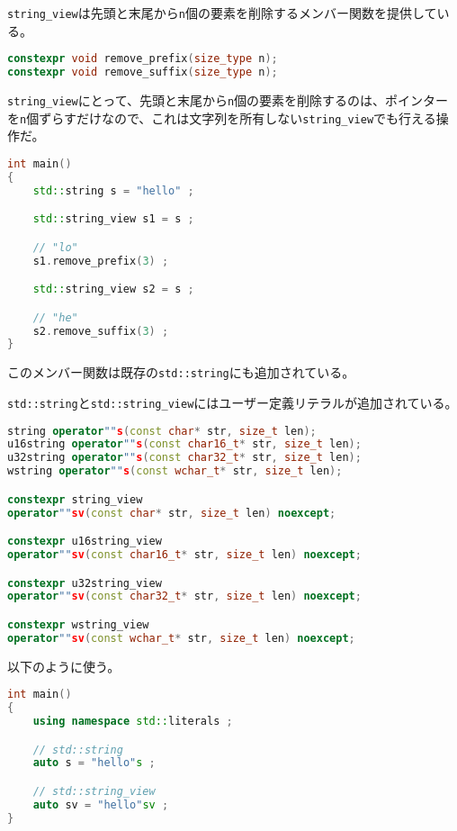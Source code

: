 %

\lstinline!string_view!は先頭と末尾から\lstinline!n!個の要素を削除するメンバー関数を提供している。

\begin{lstlisting}[language=C++]
constexpr void remove_prefix(size_type n);
constexpr void remove_suffix(size_type n);
\end{lstlisting}

\lstinline!string_view!にとって、先頭と末尾から\lstinline!n!個の要素を削除するのは、ポインターを\lstinline!n!個ずらすだけなので、これは文字列を所有しない\lstinline!string_view!でも行える操作だ。

\begin{lstlisting}[language=C++]
int main()
{
    std::string s = "hello" ;

    std::string_view s1 = s ;

    // "lo"
    s1.remove_prefix(3) ;

    std::string_view s2 = s ;

    // "he"
    s2.remove_suffix(3) ;
}
\end{lstlisting}

このメンバー関数は既存の\lstinline!std::string!にも追加されている。

%

\lstinline!std::string!と\lstinline!std::string_view!にはユーザー定義リテラルが追加されている。

\begin{lstlisting}[language=C++]
string operator""s(const char* str, size_t len);
u16string operator""s(const char16_t* str, size_t len);
u32string operator""s(const char32_t* str, size_t len);
wstring operator""s(const wchar_t* str, size_t len);

constexpr string_view
operator""sv(const char* str, size_t len) noexcept;

constexpr u16string_view
operator""sv(const char16_t* str, size_t len) noexcept;

constexpr u32string_view
operator""sv(const char32_t* str, size_t len) noexcept;

constexpr wstring_view
operator""sv(const wchar_t* str, size_t len) noexcept;
\end{lstlisting}

以下のように使う。

\begin{lstlisting}[language=C++]
int main()
{
    using namespace std::literals ;

    // std::string
    auto s = "hello"s ;

    // std::string_view
    auto sv = "hello"sv ;
}
\end{lstlisting}

